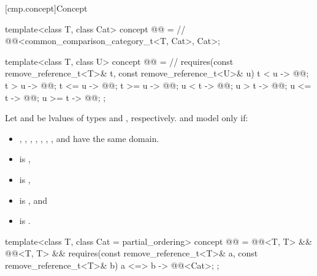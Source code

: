 [cmp.concept]{Concept }

\begin{codeblock}
template<class T, class Cat>
  concept @@ =                 // \expos
    @@<common_comparison_category_t<T, Cat>, Cat>;

template<class T, class U>
  concept @@ =      // \expos
    requires(const remove_reference_t<T>& t, const remove_reference_t<U>& u) {
      { t <  u } -> @@;
      { t >  u } -> @@;
      { t <= u } -> @@;
      { t >= u } -> @@;
      { u <  t } -> @@;
      { u >  t } -> @@;
      { u <= t } -> @@;
      { u >= t } -> @@;
    };
\end{codeblock}

\pnum
Let  and  be
lvalues of types  and
, respectively.
 and  model
 only if:
\begin{itemize}
\item
  ,
  ,
  ,
  ,
  ,
  ,
  , and
  have the same domain.
\item
   is ,
\item
   is ,
\item
   is , and
\item
   is .
\end{itemize}

\begin{codeblock}
template<class T, class Cat = partial_ordering>
  concept @@ =
    @@<T, T> &&
    @@<T, T> &&
    requires(const remove_reference_t<T>& a, const remove_reference_t<T>& b) {
      { a <=> b } -> @@<Cat>;
    };
\end{codeblock}

